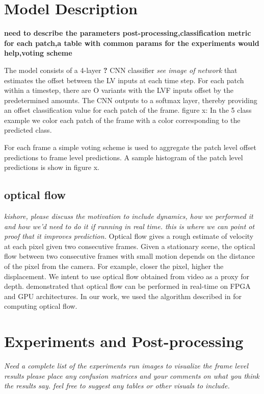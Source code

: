 \documentclass{article}
\begin{document}


\section{Model Description}
\textbf{need to describe the parameters post-processing,classification metric for each patch,a table with common params for the experiments would help,voting scheme}

The model consists of a 4-layer \textbf{?} CNN classifier \textit{see image of network} that estimates the offset between the LV inputs at each time step. For each patch within a timestep, there are O variants with the LVF inputs offset by the predetermined amounts. The CNN outputs to a softmax layer, thereby providing an offset classification value for each patch of the frame. 
figure x: In the 5 class example we color each patch of the frame with a color corresponding to the predicted class. 

For each frame a simple voting scheme is used to aggregate the patch level offset predictions to frame level predictions. A sample histogram of the patch level predictions is show in figure x.

\subsection{optical flow} \textit{kishore, please discuss the motivation to include dynamics, how we performed it and how we'd need to do it if running in real time. this is where we can point ot proof that it improves prediction.}
Optical flow gives a rough estimate of velocity at each pixel given two consecutive frames. Given a stationary scene, the optical flow between two consecutive frames with small motion depends on the distance of the pixel from the camera. For example, closer the pixel, higher the displacement. We intent to use optical flow obtained from video as a proxy for depth. \cite{Opticalflow_realtime} demonstrated that optical flow can be performed in real-time on FPGA and GPU architectures. In our work, we used the algorithm described in \cite{LiuOpticalFlow} for computing optical flow.

\section{Experiments and Post-processing} %
\label{sec:experiments_and_post_processing}
\textit{Need a complete list of the experiments run
images to visualize the frame level results
please place any confusion matrices and your comments on what you think the results say.
feel free to suggest any tables or other visuals to include.}
\end{document}
